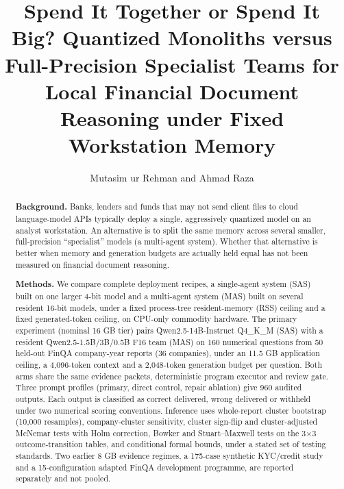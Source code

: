 \documentclass[letterpaper]{article}
\title{Spend It Together or Spend It Big? Quantized Monoliths versus Full-Precision Specialist Teams for Local Financial Document Reasoning under Fixed Workstation Memory}
\author{Mutasim ur Rehman and Ahmad Raza}
\begin{document}
\maketitle
\begin{abstract}
\textbf{Background.} Banks, lenders and funds that may not send client files to cloud language-model APIs typically deploy a single, aggressively quantized model on an analyst workstation. An alternative is to split the same memory across several smaller, full-precision ``specialist'' models (a multi-agent system). Whether that alternative is better when memory and generation budgets are actually held equal has not been measured on financial document reasoning.

\textbf{Methods.} We compare complete deployment recipes, a single-agent system (SAS) built on one larger 4-bit model and a multi-agent system (MAS) built on several resident 16-bit models, under a fixed process-tree resident-memory (RSS) ceiling and a fixed generated-token ceiling, on CPU-only commodity hardware. The primary experiment (nominal 16 GB tier) pairs Qwen2.5-14B-Instruct Q4\_K\_M (SAS) with a resident Qwen2.5-1.5B/3B/0.5B F16 team (MAS) on 160 numerical questions from 50 held-out FinQA company-year reports (36 companies), under an 11.5 GB application ceiling, a 4,096-token context and a 2,048-token generation budget per question. Both arms share the same evidence packets, deterministic program executor and review gate. Three prompt profiles (primary, direct control, repair ablation) give 960 audited outputs. Each output is classified as correct delivered, wrong delivered or withheld under two numerical scoring conventions. Inference uses whole-report cluster bootstrap (10,000 resamples), company-cluster sensitivity, cluster sign-flip and cluster-adjusted McNemar tests with Holm correction, Bowker and Stuart--Maxwell tests on the 3×3 outcome-transition tables, and conditional formal bounds, under a stated set of testing standards. Two earlier 8 GB evidence regimes, a 175-case synthetic KYC/credit study and a 15-configuration adapted FinQA development programme, are reported separately and not pooled.


\end{abstract}
\end{document}
